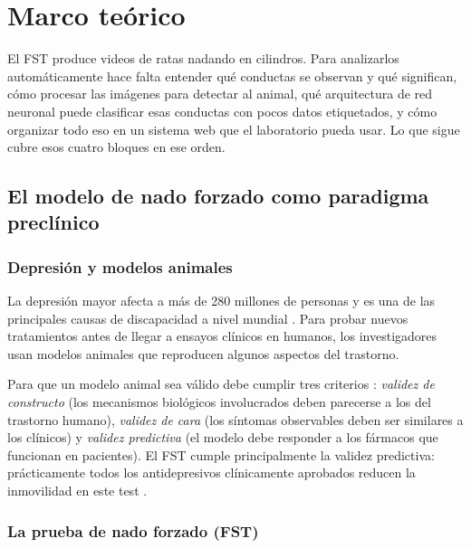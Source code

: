 
\chapter{Marco teórico}

El FST produce videos de ratas nadando en cilindros. Para analizarlos
automáticamente hace falta entender qué conductas se observan y qué
significan, cómo procesar las imágenes para detectar al animal, qué
arquitectura de red neuronal puede clasificar esas conductas con pocos
datos etiquetados, y cómo organizar todo eso en un sistema web que el
laboratorio pueda usar. Lo que sigue cubre esos cuatro bloques en ese
orden.

\section{El modelo de nado forzado como paradigma preclínico}

\subsection{Depresión y modelos animales}

La depresión mayor afecta a más de 280 millones de personas y es una de las principales
causas de discapacidad a nivel mundial \cite{who_depression_2025}. Para probar nuevos
tratamientos antes de llegar a ensayos clínicos en humanos, los investigadores usan
modelos animales que reproducen algunos aspectos del trastorno.

Para que un modelo animal sea válido debe cumplir tres criterios \cite{slattery2012}:
\textit{validez de constructo} (los mecanismos biológicos involucrados deben parecerse
a los del trastorno humano), \textit{validez de cara} (los síntomas observables deben
ser similares a los clínicos) y \textit{validez predictiva} (el modelo debe responder a
los fármacos que funcionan en pacientes). El FST cumple principalmente la validez
predictiva: prácticamente todos los antidepresivos clínicamente aprobados reducen la
inmovilidad en este test \cite{cryan2005}.

\subsection{La prueba de nado forzado (FST)}

